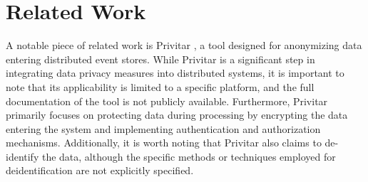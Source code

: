 \section{Related Work}
A notable piece of related work is Privitar \cite{privitar}, a tool designed for anonymizing data entering distributed event stores. While Privitar is a significant step in integrating data privacy measures into distributed systems, it is important to note that its applicability is limited to a specific platform, and the full documentation of the tool is not publicly available. Furthermore, Privitar primarily focuses on protecting data during processing by encrypting the data entering the system and implementing authentication and authorization mechanisms. Additionally, it is worth noting that Privitar also claims to de-identify the data, although the specific methods or techniques employed for deidentification are not explicitly specified. 





